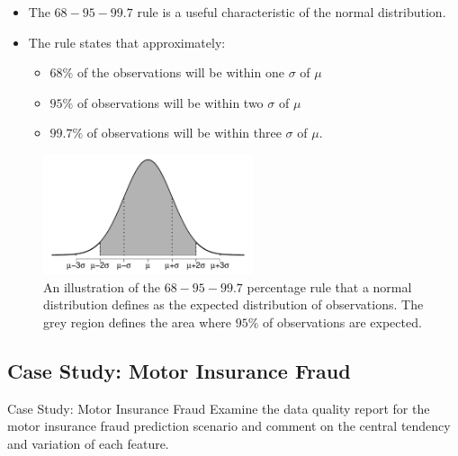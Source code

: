 \documentclass[xcolor={table}]{beamer}
\begin{document}
 \begin{frame} 
 	\begin{itemize}
		\item The $68-95-99.7$ rule is a useful characteristic of the normal distribution. 
		\item The rule states that  approximately: 
		 	\begin{itemize}
				\item $68\%$ of the observations will be within one $\sigma$ of $\mu$
				\item $95\%$ of observations will be within two $\sigma$ of $\mu$ 
				\item $99.7\%$ of observations will be within three $\sigma$ of $\mu$. 
		 	\end{itemize}
 	\end{itemize}
\end{frame} 

 \begin{frame} [plain]
\begin{figure}
\centerline{
\includegraphics[width=0.55\textwidth]{./images/pdf_normal6895997_shorter.pdf}
}
\caption{An illustration of the $68-95-99.7$ percentage rule that a normal distribution defines as the expected distribution of observations. The grey region defines the area where $95\%$ of observations are expected.}
\label{fig:pdf_normal6895997}
\end{figure}
\end{frame} 

\subsection{Case Study: Motor Insurance Fraud}

\begin{frame}
\begin{block}{Case Study: Motor Insurance Fraud}
Examine the data quality report for the motor insurance fraud prediction scenario and comment on the central tendency and variation of each feature.
\end{block}
\end{frame}
\end{document}
